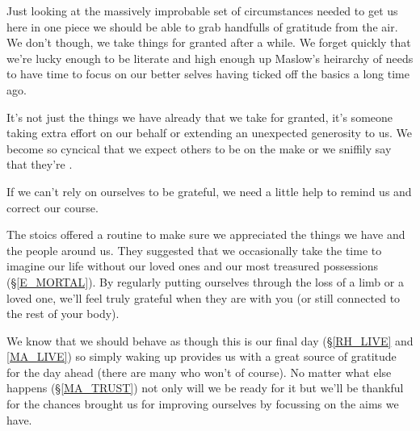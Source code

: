 \cleartorightpage
{\small

Just looking at the massively improbable set of circumstances needed to get us here in one piece we should be able to grab handfulls of gratitude from the air. We don't though, we take things for granted after a while. We forget quickly that we're lucky enough to be literate and high enough up Maslow's heirarchy of needs to have time to focus on our better selves having ticked off the basics a long time ago. 

It's not just the things we have already that we take for granted, it's someone taking extra effort on our behalf or extending an unexpected generosity to us. We become so cyncical that we expect others to be on the make or we sniffily say that they're .

If we can't rely on ourselves to be  grateful, we need a little help to remind us and correct our course.

The stoics offered a routine to make sure we appreciated the things we have and the people around us. They suggested that we occasionally take the time to imagine our life without our loved ones and our most treasured possessions (\S \ref{E_MORTAL}). By regularly putting ourselves through the loss of a limb or a loved one, we'll feel truly grateful when they are with you (or still connected to the rest of your body).

We know that we should behave as though this is our final day (\S \ref{RH_LIVE} and \ref{MA_LIVE}) so simply waking up provides us with a great source of gratitude for the day ahead (there are many who won't of course). No matter what else happens (\S \ref{MA_TRUST}) not only will we be ready for it but we'll be thankful for the chances brought us for improving ourselves by focussing on the aims we have.

}
